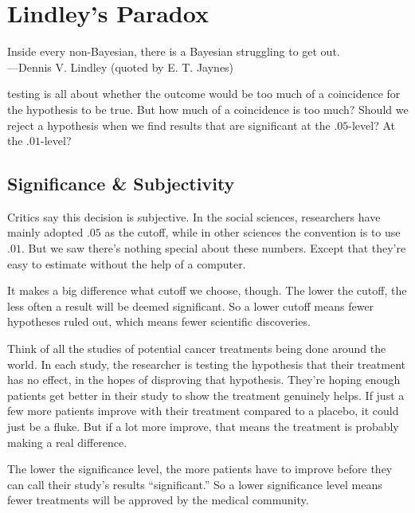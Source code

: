 \documentclass[justified]{tufte-book}
\newenvironment{epigraph}%
{
\begin{flushright}    
\begin{minipage}{20em}
\begin{flushright}
\itshape
}%
{
\end{flushright}
\end{minipage}
\end{flushright}
}
\theoremstyle{definition}
\theoremstyle{definition}
\theoremstyle{definition}
\theoremstyle{definition}
\theoremstyle{remark}
\begin{document}
\hypertarget{chlindley}{%
\chapter{Lindley's Paradox}\label{chlindley}}

\begin{epigraph}
Inside every non-Bayesian, there is a Bayesian struggling to get out.\\
---Dennis V. Lindley (quoted by E. T. Jaynes)
\end{epigraph}

 testing is all about whether the outcome would be too much of a coincidence for the hypothesis to be true. But how much of a coincidence is too much? Should we reject a hypothesis when we find results that are significant at the \(.05\)-level? At the \(.01\)-level?

\hypertarget{significance-subjectivity}{%
\section{Significance \& Subjectivity}\label{significance-subjectivity}}

Critics say this decision is subjective. In the social sciences, researchers have mainly adopted \(.05\) as the cutoff, while in other sciences the convention is to use \(.01\). But we saw there's nothing special about these numbers. Except that they're easy to estimate without the help of a computer.

It makes a big difference what cutoff we choose, though. The lower the cutoff, the less often a result will be deemed significant. So a lower cutoff means fewer hypotheses ruled out, which means fewer scientific discoveries.

Think of all the studies of potential cancer treatments being done around the world. In each study, the researcher is testing the hypothesis that their treatment has no effect, in the hopes of disproving that hypothesis. They're hoping enough patients get better in their study to show the treatment genuinely helps. If just a few more patients improve with their treatment compared to a placebo, it could just be a fluke. But if a lot more improve, that means the treatment is probably making a real difference.

The lower the significance level, the more patients have to improve before they can call their study's results ``significant.'' So a lower significance level means fewer treatments will be approved by the medical community.
\end{document}
